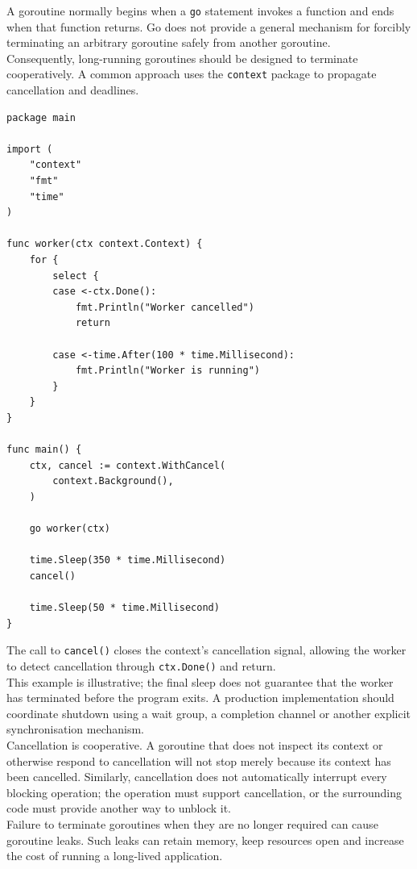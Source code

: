 A goroutine normally begins when a \texttt{go} statement invokes a function and ends when that function returns. Go does not provide a general mechanism for forcibly terminating an arbitrary goroutine safely from another goroutine.\\

Consequently, long-running goroutines should be designed to terminate cooperatively. A common approach uses the \texttt{context} package to propagate cancellation and deadlines.

\begin{lstlisting}
package main

import (
    "context"
    "fmt"
    "time"
)

func worker(ctx context.Context) {
    for {
        select {
        case <-ctx.Done():
            fmt.Println("Worker cancelled")
            return

        case <-time.After(100 * time.Millisecond):
            fmt.Println("Worker is running")
        }
    }
}

func main() {
    ctx, cancel := context.WithCancel(
        context.Background(),
    )

    go worker(ctx)

    time.Sleep(350 * time.Millisecond)
    cancel()

    time.Sleep(50 * time.Millisecond)
}
\end{lstlisting}

The call to \texttt{cancel()} closes the context's cancellation signal, allowing the worker to detect cancellation through \texttt{ctx.Done()} and return.\\

This example is illustrative; the final sleep does not guarantee that the worker has terminated before the program exits. A production implementation should coordinate shutdown using a wait group, a completion channel or another explicit synchronisation mechanism.\\

Cancellation is cooperative. A goroutine that does not inspect its context or otherwise respond to cancellation will not stop merely because its context has been cancelled. Similarly, cancellation does not automatically interrupt every blocking operation; the operation must support cancellation, or the surrounding code must provide another way to unblock it.\\

Failure to terminate goroutines when they are no longer required can cause goroutine leaks. Such leaks can retain memory, keep resources open and increase the cost of running a long-lived application.\\

